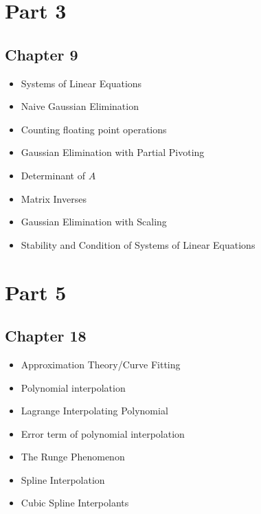 \documentclass [titlepage,12pt,letter] {article}
\begin{document}
\section{Part 3}

\subsection{Chapter 9}

\begin{itemize}

\item{Systems of Linear Equations}

\item{Naive Gaussian Elimination}

\item{Counting floating point operations} 

\item{Gaussian Elimination with Partial Pivoting}

\item{Determinant of $A$}

\item{Matrix Inverses} 

\item{Gaussian Elimination with Scaling}

\item{Stability and Condition of Systems of Linear Equations}

\end{itemize}

\section{Part 5}

\subsection{Chapter 18}

\begin{itemize}

\item{Approximation Theory/Curve Fitting} 

\item{Polynomial interpolation} 

\item{Lagrange Interpolating Polynomial} 

\item{Error term of polynomial interpolation} 

\item{The Runge Phenomenon}

\item{Spline Interpolation} 

\item{Cubic Spline Interpolants}

\end{itemize}
\end{document}
